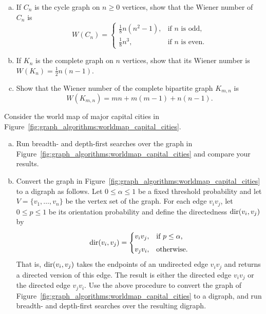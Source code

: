 \begin{problem}
\begin{enumerate}[(a)]
  \item If $C_n$ is the cycle graph on $n \geq 0$ vertices, show that
    the Wiener number of $C_n$ is
    \[
    W(C_n)
    =
    \begin{cases}
    \frac{1}{8} n(n^2 - 1), & \text{if $n$ is odd,} \\[4pt]
    \frac{1}{8} n^3, & \text{if $n$ is even.}
    \end{cases}
    \]

  \item If $K_n$ is the complete graph on $n$ vertices, show that its
    Wiener number is $W(K_n) = \frac{1}{2} n(n - 1)$.

  \item Show that the Wiener number of the complete bipartite graph
    $K_{m,n}$ is
    \[
    W(K_{m,n}) = mn + m(m - 1) + n(n - 1).
    \]
  \end{enumerate}

\item Consider the world map of major capital cities in
  Figure~\ref{fig:graph_algorithms:worldmap_capital_cities}.
  \begin{enumerate}[(a)]
  \item Run breadth- and
    depth-first searches over the graph in
    Figure~\ref{fig:graph_algorithms:worldmap_capital_cities} and
    compare your results.

  \item Convert the graph in
    Figure~\ref{fig:graph_algorithms:worldmap_capital_cities} to a
    digraph as follows. Let $0 \leq \alpha \leq 1$ be a fixed
    threshold probability and let
    $V = \{v_1, \dots, v_n\}$ be the vertex set of the graph. For each
    edge $v_i v_j$, let $0 \leq p \leq 1$ be its
    orientation probability and define
    the directedness $\operatorname*{dir}(v_i, v_j)$\index{$\dir$} by
    \[
    \operatorname*{dir}(v_i, v_j)
    =
    \begin{cases}
    v_i v_j, & \text{if $p \leq \alpha$,} \\[4pt]
    v_j v_i, & \text{otherwise.}
    \end{cases}
    \]
    That is, $\operatorname*{dir}(v_i, v_j)$ takes the endpoints of an undirected
    edge $v_i v_j$ and returns a directed version of this edge. The
    result is either the directed edge $v_i v_j$ or the directed edge
    $v_j v_i$. Use the above procedure to convert the graph of
    Figure~\ref{fig:graph_algorithms:worldmap_capital_cities} to a
    digraph, and run breadth- and
    depth-first searches over the resulting
    digraph.


\end{enumerate}
\end{problem}
